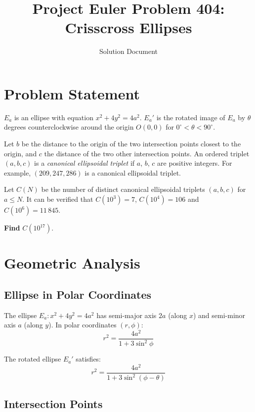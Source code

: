 \documentclass[11pt,a4paper]{article}
\title{Project Euler Problem 404:\\Crisscross Ellipses}
\author{Solution Document}
\date{}
\begin{document}
\maketitle

\section{Problem Statement}

$E_a$ is an ellipse with equation $x^2 + 4y^2 = 4a^2$.
$E_a'$ is the rotated image of $E_a$ by $\theta$ degrees counterclockwise around the origin
$O(0,0)$ for $0^\circ < \theta < 90^\circ$.

Let $b$ be the distance to the origin of the two intersection points closest to the origin,
and $c$ the distance of the two other intersection points.
An ordered triplet $(a,b,c)$ is a \emph{canonical ellipsoidal triplet} if $a$, $b$, $c$ are
positive integers. For example, $(209, 247, 286)$ is a canonical ellipsoidal triplet.

Let $C(N)$ be the number of distinct canonical ellipsoidal triplets $(a,b,c)$ for $a \leq N$.
It can be verified that $C(10^3) = 7$, $C(10^4) = 106$ and $C(10^6) = 11\,845$.

\textbf{Find} $C(10^{17})$.

\section{Geometric Analysis}

\subsection{Ellipse in Polar Coordinates}

The ellipse $E_a\colon x^2 + 4y^2 = 4a^2$ has semi-major axis $2a$ (along $x$) and
semi-minor axis $a$ (along $y$). In polar coordinates $(r, \phi)$:
\begin{equation}\label{eq:polar}
  r^2 = \frac{4a^2}{1 + 3\sin^2\phi}
\end{equation}

The rotated ellipse $E_a'$ satisfies:
\begin{equation}
  r^2 = \frac{4a^2}{1 + 3\sin^2(\phi - \theta)}
\end{equation}

\subsection{Intersection Points}
\end{document}
